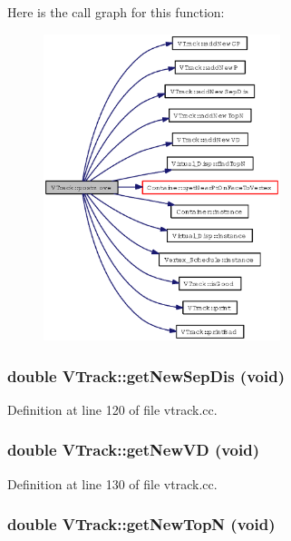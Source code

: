 Here is the call graph for this function:\begin{figure}[H]
\begin{center}
\leavevmode
\includegraphics[width=196pt]{classVTrack_6cc3f121ae5886b77b7b40dee5ffe05d_cgraph}
\end{center}
\end{figure}
\subsubsection{\setlength{\rightskip}{0pt plus 5cm}double VTrack::get\-New\-Sep\-Dis (void)}\label{classVTrack_bcb8869fdc244de38ca59692bde74bae}




Definition at line 120 of file vtrack.cc.
\subsubsection{\setlength{\rightskip}{0pt plus 5cm}double VTrack::get\-New\-VD (void)}\label{classVTrack_8771b40859350a138ba1219bdb46301a}




Definition at line 130 of file vtrack.cc.
\subsubsection{\setlength{\rightskip}{0pt plus 5cm}double VTrack::get\-New\-Top\-N (void)}\label{classVTrack_205f875344d638949aa1cfb9e0fc24cf}




